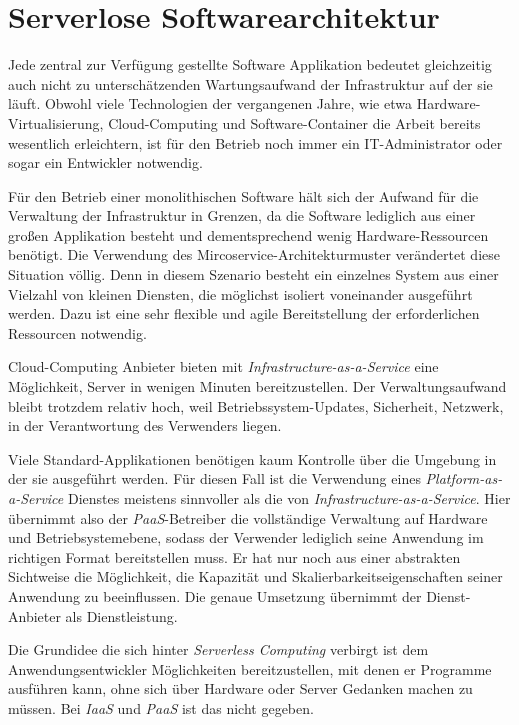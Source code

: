 \chapter{Serverlose Softwarearchitektur}

Jede zentral zur Verfügung gestellte Software Applikation bedeutet gleichzeitig auch nicht zu unterschätzenden Wartungsaufwand der Infrastruktur auf der sie läuft. Obwohl viele Technologien der vergangenen Jahre, wie etwa Hardware-Virtualisierung, Cloud-Computing und Software-Container die Arbeit bereits wesentlich erleichtern, ist für den Betrieb noch immer ein IT-Administrator oder sogar ein Entwickler notwendig.

Für den Betrieb einer monolithischen Software hält sich der Aufwand für die Verwaltung der Infrastruktur in Grenzen, da die Software lediglich aus einer großen Applikation besteht und dementsprechend wenig Hardware-Ressourcen benötigt. Die Verwendung des Mircoservice-Architekturmuster verändertet diese Situation völlig. Denn in diesem Szenario besteht ein einzelnes System aus einer Vielzahl von kleinen Diensten, die möglichst isoliert voneinander ausgeführt werden. Dazu ist eine sehr flexible und agile Bereitstellung der erforderlichen Ressourcen notwendig.

Cloud-Computing Anbieter bieten mit \textit{Infrastructure-as-a-Service} eine Möglichkeit, Server in wenigen Minuten bereitzustellen. Der Verwaltungsaufwand bleibt trotzdem relativ hoch, weil Betriebssystem-Updates, Sicherheit, Netzwerk, \usw in der Verantwortung des Verwenders liegen.

Viele Standard-Applikationen benötigen kaum Kontrolle über die Umgebung in der sie ausgeführt werden. Für diesen Fall ist die Verwendung eines \textit{Platform-as-a-Service} Dienstes meistens sinnvoller als die von \textit{Infrastructure-as-a-Service}. Hier übernimmt also der \textit{PaaS}-Betreiber die vollständige Verwaltung auf Hardware und Betriebsystemebene, sodass der Verwender lediglich seine Anwendung im richtigen Format bereitstellen muss. Er hat nur noch aus einer abstrakten Sichtweise die Möglichkeit, die Kapazität und Skalierbarkeitseigenschaften seiner Anwendung zu beeinflussen. Die genaue Umsetzung übernimmt der Dienst-Anbieter als Dienstleistung.

Die Grundidee die sich hinter \textit{Serverless Computing} verbirgt ist dem Anwendungsentwickler Möglichkeiten bereitzustellen, mit denen er Programme ausführen kann, ohne sich über Hardware oder Server Gedanken machen zu müssen. Bei \textit{IaaS} und \textit{PaaS} ist das nicht gegeben.

